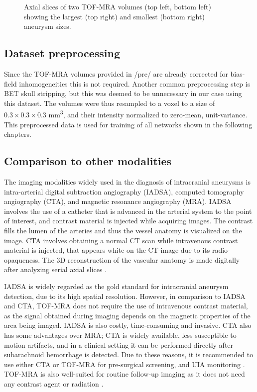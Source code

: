 \begin{figure}
\begin{subfigure}{0.9\linewidth}
	\end{subfigure}
	\caption[TOF-MRA axial slices and corresponding aneurysm label axial slices]{Axial slices of two TOF-MRA volumes (top left, bottom left) showing the largest (top right) and smallest (bottom right) aneurysm sizes.}
	\label{fig:ax-tof-aneus.png}
\end{figure}

\subsection{Dataset preprocessing}
Since the TOF-MRA volumes provided in /pre/ are already corrected for bias-field inhomogeneities this is not required. Another common preprocessing step is BET skull stripping, but this was deemed to be unnecessary in our case using this dataset. The volumes were thus resampled to a voxel to a size of $0.3 \times 0.3 \times 0.3$ mm\textsuperscript{3}, and their intensity normalized to zero-mean, unit-variance. This preprocessed data is used for training of all networks shown in the following chapters.

\subsection{Comparison to other modalities}
The imaging modalities widely used in the diagnosis of intracranial aneurysms is intra-arterial digital subtraction angiography (IADSA), computed tomography angiography (CTA), and magnetic resonance angiography (MRA). IADSA involves the use of a catheter that is advanced in the arterial system to the point of interest, and contrast material is injected while acquiring images. The contrast fills the lumen of the arteries and thus the vessel anatomy is visualized on the image. CTA involves obtaining a normal CT scan while intravenous contrast material is injected, that appears white on the CT-image due to its radio-opaqueness. The 3D reconstruction of the vascular anatomy is made digitally after analyzing serial axial slices \cite{Keedy2006}.

IADSA is widely regarded as the gold standard for intracranial aneurysm detection, due to its high spatial resolution. However, in comparison to IADSA and CTA, TOF-MRA does not require the use of intravenous contrast material, as the signal obtained during imaging depends on the magnetic properties of the area being imaged. IADSA is also costly, time-consuming and invasive. CTA also has some advantages over MRA; CTA is widely available, less susceptible to motion artifacts, and in a clinical setting it can be performed directly after subarachnoid hemorrhage is detected. Due to these reasons, it is recommended to use either CTA or TOF-MRA for pre-surgical screening, and UIA monitoring \cite{Keedy2006, Sailer2014, Wardlaw2000}. TOF-MRA is also well-suited for routine follow-up imaging as it does not need any contrast agent or radiation \cite{Lane2015}.

